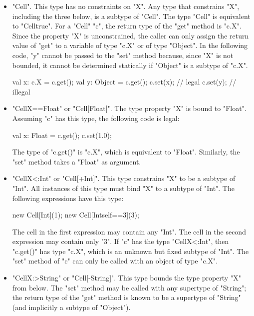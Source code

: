 \begin{itemize}
\item \xcd"Cell".  This type has no constraints on \xcd"X".
Any type that constrains \xcd"X", including the three below,
is a subtype of \xcd"Cell".  The type \xcd"Cell" is equivalent to
\xcd"Cell{true}".
%
For a \xcd"Cell" \xcd"c", the return type of the \xcd"get" method 
is \xcd"c.X".  
Since the property \xcd"X" is unconstrained,  
the caller can only assign the return value of \xcd"get"
to a variable of type \xcd"c.X" or of type \xcd"Object".
In the following code, \xcd"y" cannot be passed to the \xcd"set" method
because, since \xcd"X" is not bounded,
it cannot be determined statically if \xcd"Object" is a
subtype of \xcd"c.X".
\begin{xten}
val x: c.X = c.get();
val y: Object = c.get();
c.set(x); // legal
c.set(y); // illegal
\end{xten}

\item \xcd"Cell{X==Float}" or \xcd"Cell[Float]".
The type property \xcd"X" is bound to \xcd"Float".
Assuming \xcd"c" has this type, the following code is legal:
\begin{xten}
val x: Float = c.get();
c.set(1.0);
\end{xten}
The type of \xcd"c.get()" is \xcd"c.X", which is equivalent to
\xcd"Float".
Similarly, the \xcd"set" method takes a \xcd"Float" as argument.

\item \xcd"Cell{X<:Int}" or \xcd"Cell[+Int]".
This type constrains \xcd"X" to be a subtype of \xcd"Int".
All instances of this type must bind \xcd"X" to a subtype of \xcd"Int".
The following expressions have this type:
\begin{xten}
new Cell[Int](1);
new Cell[Int{self==3}](3);
\end{xten}
The cell in the first expression may contain any \xcd"Int".
The cell in the second expression may contain only \xcd"3".
%
If \xcd"c" has the type \xcd"Cell{X<:Int}",
then \xcd"c.get()" has type \xcd"c.X", which is an unknown but
fixed subtype of \xcd"Int".  The \xcd"set" method of \xcd"c" can
only be called with an object of type \xcd"c.X".

\item \xcd"Cell{X:>String}" or \xcd"Cell[-String]".  This type bounds the type property
\xcd"X"
from below.  The \xcd"set" method may be called with any
supertype of \xcd"String"; the return type of the \xcd"get"
method is known to be a
supertype of \xcd"String" (and implicitly a subtype of \xcd"Object").
\end{itemize}


